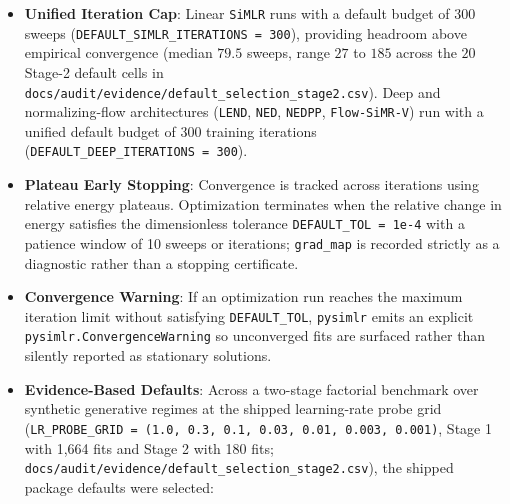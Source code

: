 \documentclass[
  10pt,
  letterpaper,
]{report}
\providecommand{\tightlist}{%
  \setlength{\itemsep}{0pt}\setlength{\parskip}{0pt}}
\begin{document}
\begin{itemize}
\tightlist
\item
  \textbf{Unified Iteration Cap}: Linear \texttt{SiMLR} runs with a
  default budget of \(300\) sweeps
  (\texttt{DEFAULT\_SIMLR\_ITERATIONS\ =\ 300}), providing headroom
  above empirical convergence (median \(79.5\) sweeps, range \(27\) to
  \(185\) across the \(20\) Stage-2 default cells in
  \texttt{docs/audit/evidence/default\_selection\_stage2.csv}). Deep and
  normalizing-flow architectures (\texttt{LEND}, \texttt{NED},
  \texttt{NEDPP}, \texttt{Flow-SiMR-V}) run with a unified default
  budget of \(300\) training iterations
  (\texttt{DEFAULT\_DEEP\_ITERATIONS\ =\ 300}).
\item
  \textbf{Plateau Early Stopping}: Convergence is tracked across
  iterations using relative energy plateaus. Optimization terminates
  when the relative change in energy satisfies the dimensionless
  tolerance \texttt{DEFAULT\_TOL\ =\ 1e-4} with a patience window of 10
  sweeps or iterations; \texttt{grad\_map} is recorded strictly as a
  diagnostic rather than a stopping certificate.
\item
  \textbf{Convergence Warning}: If an optimization run reaches the
  maximum iteration limit without satisfying \texttt{DEFAULT\_TOL},
  \texttt{pysimlr} emits an explicit \texttt{pysimlr.ConvergenceWarning}
  so unconverged fits are surfaced rather than silently reported as
  stationary solutions.
\item
  \textbf{Evidence-Based Defaults}: Across a two-stage factorial
  benchmark over synthetic generative regimes at the shipped
  learning-rate probe grid
  (\texttt{LR\_PROBE\_GRID\ =\ (1.0,\ 0.3,\ 0.1,\ 0.03,\ 0.01,\ 0.003,\ 0.001)},
  Stage 1 with 1,664 fits and Stage 2 with 180 fits;
  \texttt{docs/audit/evidence/default\_selection\_stage2.csv}), the
  shipped package defaults were selected:


\end{itemize}
\end{document}

